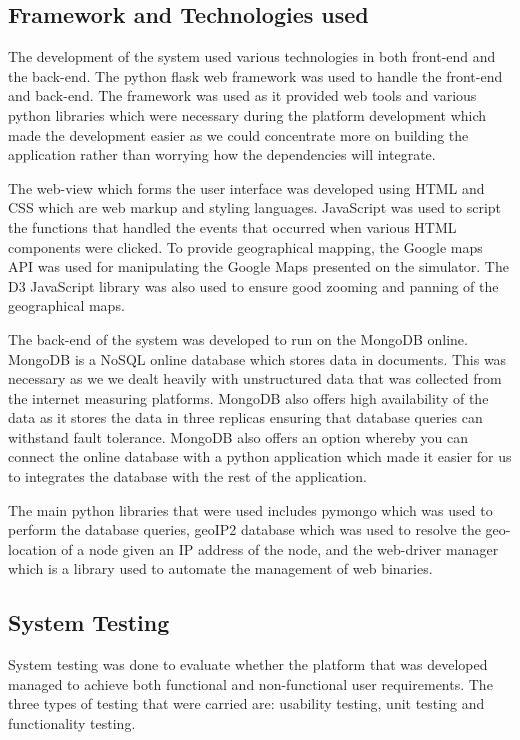 \subsection{Framework and Technologies used}
The development of the system used various technologies in both front-end and the back-end. The python flask web framework was used to handle the front-end and back-end. The framework was used as it provided web tools and various python libraries which were necessary during the platform development which made the development easier as we could concentrate more on building the application rather than worrying how the dependencies will integrate. 

The web-view which forms the user interface was developed using HTML and CSS which are web markup and styling languages. JavaScript was used to script the functions that handled the events that occurred when various HTML components were clicked. To provide geographical mapping, the Google maps API was used for manipulating the Google Maps presented on the simulator. The D3 JavaScript library was also used to ensure good zooming and panning of the geographical maps. 

The back-end of the system was developed to run on the MongoDB online. MongoDB is a NoSQL online database which stores data in documents. This was necessary as we we dealt heavily with unstructured data that was collected from the internet measuring platforms. MongoDB also offers high availability of the data as it stores the data in three replicas ensuring that database queries can withstand fault tolerance. MongoDB also offers an option whereby you can connect the online database with a python application which made it easier for us to integrates the database with the rest of the application.  

The main python libraries that were used includes pymongo which was used to perform the database queries, geoIP2 database which was used to resolve the geo-location of a node given an IP address of the node, and the web-driver manager which is a library used to automate the management of web binaries. 

\subsection{System Testing}
System testing was done to evaluate whether the platform that was developed managed to achieve both functional and non-functional user requirements. The three types of testing that were carried are: usability testing, unit testing and functionality testing.
